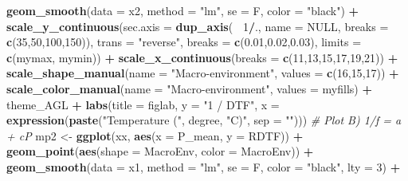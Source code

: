 \documentclass[
]{article}
\newenvironment{Shaded}{\begin{snugshade}}{\end{snugshade}}
\newcommand{\CommentTok}[1]{\textcolor[rgb]{0.56,0.35,0.01}{\textit{#1}}}
\newcommand{\DataTypeTok}[1]{\textcolor[rgb]{0.13,0.29,0.53}{#1}}
\newcommand{\DecValTok}[1]{\textcolor[rgb]{0.00,0.00,0.81}{#1}}
\newcommand{\FloatTok}[1]{\textcolor[rgb]{0.00,0.00,0.81}{#1}}
\newcommand{\KeywordTok}[1]{\textcolor[rgb]{0.13,0.29,0.53}{\textbf{#1}}}
\newcommand{\NormalTok}[1]{#1}
\newcommand{\OperatorTok}[1]{\textcolor[rgb]{0.81,0.36,0.00}{\textbf{#1}}}
\newcommand{\OtherTok}[1]{\textcolor[rgb]{0.56,0.35,0.01}{#1}}
\newcommand{\StringTok}[1]{\textcolor[rgb]{0.31,0.60,0.02}{#1}}
\begin{document}
\begin{Shaded}
\begin{Highlighting}[]
{{{{{\StringTok{    }\KeywordTok{geom_smooth}\NormalTok{(}\DataTypeTok{data =}\NormalTok{ x2, }\DataTypeTok{method =} \StringTok{"lm"}\NormalTok{, }\DataTypeTok{se =}\NormalTok{ F, }\DataTypeTok{color =} \StringTok{"black"}\NormalTok{) }\OperatorTok{+}
\StringTok{    }\KeywordTok{scale_y_continuous}\NormalTok{(}\DataTypeTok{sec.axis =} \KeywordTok{dup_axis}\NormalTok{(}\OperatorTok{~}\StringTok{ }\DecValTok{1}\OperatorTok{/}\NormalTok{., }\DataTypeTok{name =} \OtherTok{NULL}\NormalTok{, }\DataTypeTok{breaks =} \KeywordTok{c}\NormalTok{(}\DecValTok{35}\NormalTok{,}\DecValTok{50}\NormalTok{,}\DecValTok{100}\NormalTok{,}\DecValTok{150}\NormalTok{)),}
                       \DataTypeTok{trans =} \StringTok{"reverse"}\NormalTok{, }\DataTypeTok{breaks =} \KeywordTok{c}\NormalTok{(}\FloatTok{0.01}\NormalTok{,}\FloatTok{0.02}\NormalTok{,}\FloatTok{0.03}\NormalTok{), }\DataTypeTok{limits =} \KeywordTok{c}\NormalTok{(mymax, mymin)) }\OperatorTok{+}
\StringTok{    }\KeywordTok{scale_x_continuous}\NormalTok{(}\DataTypeTok{breaks =} \KeywordTok{c}\NormalTok{(}\DecValTok{11}\NormalTok{,}\DecValTok{13}\NormalTok{,}\DecValTok{15}\NormalTok{,}\DecValTok{17}\NormalTok{,}\DecValTok{19}\NormalTok{,}\DecValTok{21}\NormalTok{)) }\OperatorTok{+}
\StringTok{    }\KeywordTok{scale_shape_manual}\NormalTok{(}\DataTypeTok{name =} \StringTok{"Macro-environment"}\NormalTok{, }\DataTypeTok{values =} \KeywordTok{c}\NormalTok{(}\DecValTok{16}\NormalTok{,}\DecValTok{15}\NormalTok{,}\DecValTok{17}\NormalTok{)) }\OperatorTok{+}
\StringTok{    }\KeywordTok{scale_color_manual}\NormalTok{(}\DataTypeTok{name =} \StringTok{"Macro-environment"}\NormalTok{, }\DataTypeTok{values =}\NormalTok{ myfills) }\OperatorTok{+}
\StringTok{    }\NormalTok{theme_AGL }\OperatorTok{+}\StringTok{ }
\StringTok{    }\KeywordTok{labs}\NormalTok{(}\DataTypeTok{title =}\NormalTok{ figlab, }\DataTypeTok{y =} \StringTok{"1 / DTF"}\NormalTok{, }
         \DataTypeTok{x =} \KeywordTok{expression}\NormalTok{(}\KeywordTok{paste}\NormalTok{(}\StringTok{"Temperature ("}\NormalTok{, degree, }\StringTok{"C)"}\NormalTok{, }\DataTypeTok{sep =} \StringTok{""}\NormalTok{)))}
  \CommentTok{# Plot B) 1/f = a + cP}
\NormalTok{  mp2 <-}\StringTok{ }\KeywordTok{ggplot}\NormalTok{(xx, }\KeywordTok{aes}\NormalTok{(}\DataTypeTok{x =}\NormalTok{ P_mean, }\DataTypeTok{y =}\NormalTok{ RDTF)) }\OperatorTok{+}
\StringTok{    }\KeywordTok{geom_point}\NormalTok{(}\KeywordTok{aes}\NormalTok{(}\DataTypeTok{shape =}\NormalTok{ MacroEnv, }\DataTypeTok{color =}\NormalTok{ MacroEnv)) }\OperatorTok{+}
\StringTok{    }\KeywordTok{geom_smooth}\NormalTok{(}\DataTypeTok{data =}\NormalTok{ x1, }\DataTypeTok{method =} \StringTok{"lm"}\NormalTok{, }\DataTypeTok{se =}\NormalTok{ F, }\DataTypeTok{color =} \StringTok{"black"}\NormalTok{, }\DataTypeTok{lty =} \DecValTok{3}\NormalTok{) }\OperatorTok{+}
}}}}}
\end{Highlighting}
\end{Shaded}
\end{document}
